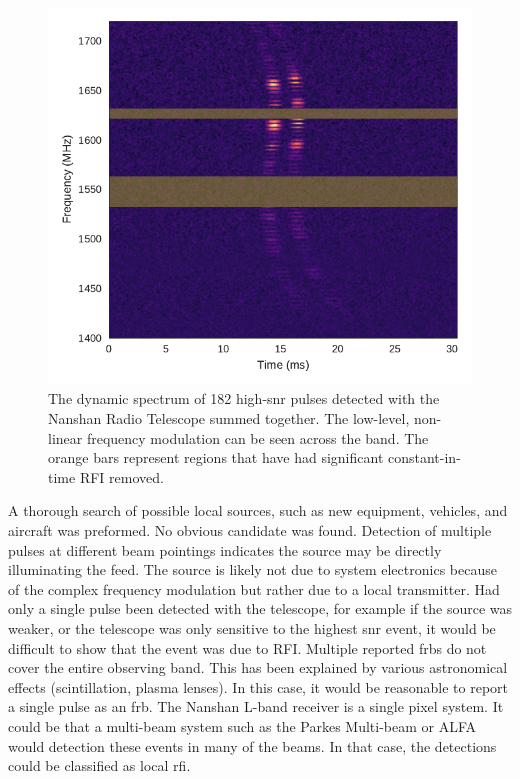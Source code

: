 \documentclass[a4paper,fleqn,usenatbib]{mnras}
\begin{document}
\begin{figure}
    \includegraphics[width=1.0\linewidth]{figures/XAO_summed_dynamic.pdf}
    \caption{The dynamic spectrum of 182 high-\gls{snr} pulses detected with the
    Nanshan Radio Telescope summed together.  The low-level, non-linear
    frequency modulation can be seen across the band. The orange bars represent
    regions that have had significant constant-in-time RFI removed.
    }
    \label{fig:xao_summed}
\end{figure}

A thorough search of possible local sources, such as new equipment, vehicles,
and aircraft was preformed. No obvious candidate was found. Detection of
multiple pulses at different beam pointings indicates the source may be directly
illuminating the feed. The source is likely not due to system electronics
because of the complex frequency modulation but rather due to a local
transmitter. Had only a single pulse been detected with the telescope, for
example if the source was weaker, or the telescope was only sensitive to the
highest \gls{snr} event, it would be difficult to show that the event was due to
RFI. Multiple reported \glspl{frb} do not cover the entire observing band. This
has been explained by various astronomical effects (scintillation, plasma
lenses). In this case, it would be reasonable to report a single pulse as an
\gls{frb}. The Nanshan L-band receiver is a single pixel system. It could be
that a multi-beam system such as the Parkes Multi-beam or ALFA would detection
these events in many of the beams. In that case, the detections could be
classified as local \gls{rfi}.
\end{document}
